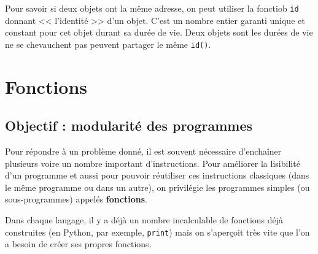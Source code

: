 Pour savoir si  deux objets ont la même adresse, on peut utiliser la fonctiob \lstinline{id} donnant << l'identité >> d'un objet.
C'est un nombre entier garanti unique et constant pour cet objet durant sa durée de vie. 
Deux objets sont les durées de vie ne se chevauchent pas peuvent partager le même \lstinline{id()}.

%
%
%







\section{Fonctions}
\subsection{Objectif : modularité des programmes}

Pour répondre à un problème donné, il est souvent nécessaire d'enchaîner plusieurs voire un nombre 
important d'instructions. Pour améliorer la lisibilité d'un programme et aussi pour pouvoir réutiliser 
ces instructions classiques (dans le même programme ou dans un autre),
on privilégie les programmes simples (ou sous-programmes) appelés \textbf{fonctions}.

Dans chaque langage, il y a déjà un nombre incalculable de fonctions déjà construites (en Python, 
par exemple, \lstinline{print}) mais on s'aperçoit très vite que l'on a besoin de créer ses propres 
fonctions.


